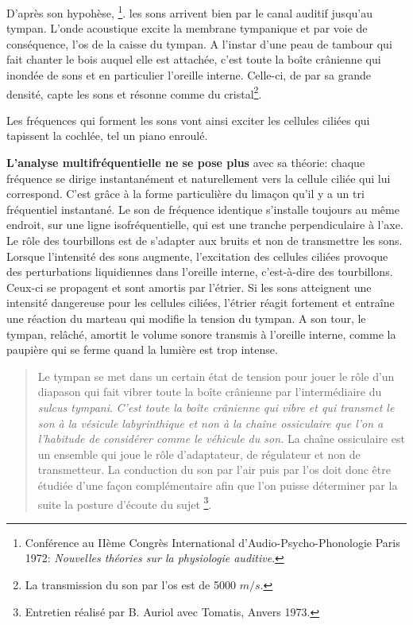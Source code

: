 D'après son hypohèse, \footnote{Conférence au IIème Congrès International d'Audio-Psycho-Phonologie
Paris 1972:  \emph{Nouvelles théories sur la physiologie auditive}.}.
 les sons arrivent bien par le canal auditif
jusqu'au tympan. L'onde acoustique excite la membrane tympanique et
par voie de conséquence, l'os de la caisse du tympan. 
A l'instar d'une
peau de tambour qui fait chanter le bois auquel elle est attachée,
c'est toute la boîte crânienne qui inondée de sons et en particulier
l'oreille interne. Celle-ci, de par sa grande densité, capte les sons
et résonne comme du cristal\footnote{La transmission du son par l'os est de 
5000 $m/s$.}.

Les fréquences qui forment les sons vont ainsi exciter les cellules
ciliées qui tapissent la cochlée, tel un piano enroulé.

{\textbf{L'analyse multifréquentielle ne se pose plus} 
avec sa théorie: chaque fréquence se dirige instantanément et
naturellement vers la cellule ciliée qui lui correspond. 
C'est grâce à la forme particulière du limaçon qu'il y a un tri fréquentiel 
instantané.
Le son de fréquence identique s'installe toujours au même endroit, sur une 
ligne isofréquentielle, qui est une tranche perpendiculaire à l'axe.
Le rôle des tourbillons est de s'adapter aux bruits
et non de transmettre les sons.
Lorsque l'intensité des sons aug\-men\-te,
l'ex\-ci\-ta\-tion des cellules ciliées provoque des perturbations liquidiennes
dans l'oreille interne, c'est-à-dire des tourbillons. Ceux-ci se propagent
et sont amortis par l'étrier. Si les sons atteignent une intensité
dangereuse pour les cellules ciliées, l'étrier réagit fortement et
entraîne une réaction du marteau qui modifie la tension du tympan.
A son tour, le tympan, relâché, amortit le volume sonore transmis
à l'oreille interne, comme la paupière qui se ferme quand la lumière
est trop intense.


\begin{quotation}
	Le tympan se met dans un certain état de tension pour jouer le
	rôle d'un diapason qui fait vibrer toute la boîte crânienne
	par l'intermédiaire du \emph{sulcus tympani}. 
	\emph{C'est toute la boîte crânienne qui vibre et qui transmet le son à 
la vésicule labyrinthique et non à la chaîne ossiculaire que l'on a l'habitude 
de considérer comme le véhicule du son.} La chaîne ossiculaire est un ensemble 
qui
	joue le rôle d'adaptateur, de régulateur et non de transmetteur. La
	conduction du son par l'air puis par l'os doit donc
	être étudiée d'une façon complémentaire afin que l'on
	puisse déterminer par la suite la posture d'écoute du sujet%
	\footnote{Entretien réalisé par B. Auriol avec Tomatis, Anvers 
1973.}.


\end{quotation}}
